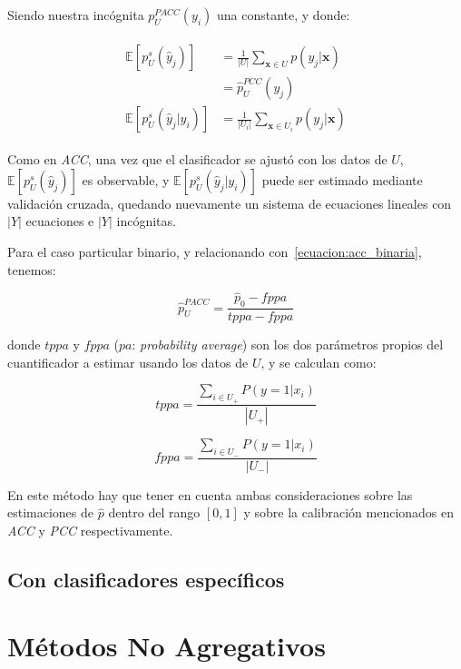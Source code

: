 Siendo nuestra incógnita $p^{PACC}_U(y_i)$ una constante, y donde:

\begin{align}
\begin{split}
    \mathbb{E}[p_{U}^{s}(\hat y_j)] &= \frac{1}{|U|}\sum_{\mathbf{x} \in U}{p(y_j|\mathbf{x})} \\
    &= \hat p^{PCC}_{U}(y_j) \\
    \mathbb{E}[p^{s}_{U}(\hat y_j|y_i)] &= \frac{1}{|U_i|}\sum_{\mathbf{x} \in U_i}{p(y_j|\mathbf{x})}
\end{split}
\end{align}

Como en {\it ACC}, una vez que el clasificador se ajustó con los datos de $U$,
$\mathbb{E}[p_{U}^{s}(\hat y_j)]$ es observable, y $\mathbb{E}[p^{s}_{U}(\hat
y_j|y_i)]$ puede ser estimado mediante validación cruzada, quedando nuevamente
un sistema de ecuaciones lineales con $|Y|$ ecuaciones e $|Y|$ incógnitas.

Para el caso particular binario, y relacionando con~\ref{ecuacion:acc_binaria},
tenemos:

\begin{equation}
    \hat p^{PACC}_{U} = \frac{\hat p_0-fppa}{tppa-fppa}
\end{equation}

donde $tppa$ y $fppa$ ($pa$: {\it probability average\/}) son los dos parámetros
propios del cuantificador a estimar usando los datos de $U$, y se calculan como:

\begin{equation}
    tppa = \frac{\sum _{i \in U_+}{P(y=1|x_i)}}{|U_+|}
\end{equation}

\begin{equation}
    fppa = \frac{\sum _{i \in U_-}{P(y=1|x_i)}}{|U_-|}
\end{equation}

En este método hay que tener en cuenta ambas consideraciones sobre las
estimaciones de $\hat p$ dentro del rango $[0, 1]$ y sobre la calibración
mencionados en {\it ACC\/} y {\it PCC\/} respectivamente.

\subsection{Con clasificadores específicos}

\section{Métodos No Agregativos}
